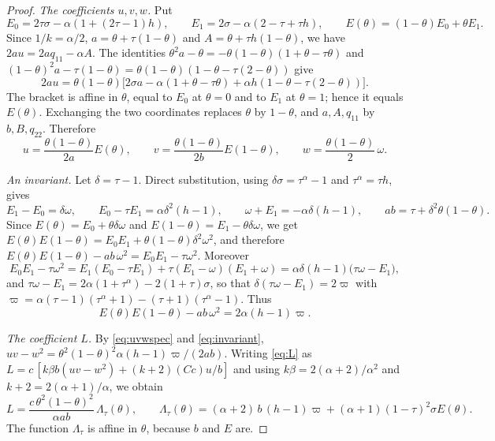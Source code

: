 \documentclass[11pt]{amsart}
\theoremstyle{definition}
\theoremstyle{remark}
\numberwithin{equation}{section}
\begin{document}
\begin{proof}
\emph{The coefficients $u,v,w$.} Put
\[
E_0=2\tau\sigma-\alpha(1+(2\tau-1)h),\qquad E_1=2\sigma-\alpha(2-\tau+\tau h),\qquad E(\theta)=(1-\theta)E_0+\theta E_1 .
\]
Since $1/k=\alpha/2$, $a=\theta+\tau(1-\theta)$ and $A=\theta+\tau h(1-\theta)$, we have $2au=2aq_{11}-\alpha A$. The identities $\theta^2a-\theta=-\theta(1-\theta)(1+\theta-\tau\theta)$ and $(1-\theta)^2a-\tau(1-\theta)=\theta(1-\theta)(1-\theta-\tau(2-\theta))$ give
\[
2au=\theta(1-\theta)\bigl[2\sigma a-\alpha(1+\theta-\tau\theta)+\alpha h(1-\theta-\tau(2-\theta))\bigr].
\]
The bracket is affine in $\theta$, equal to $E_0$ at $\theta=0$ and to $E_1$ at $\theta=1$; hence it equals $E(\theta)$. Exchanging the two coordinates replaces $\theta$ by $1-\theta$, and $a,A,q_{11}$ by $b,B,q_{22}$. Therefore
\begin{equation}\label{eq:uvwspec}
u=\frac{\theta(1-\theta)}{2a}E(\theta),\qquad v=\frac{\theta(1-\theta)}{2b}E(1-\theta),\qquad w=\frac{\theta(1-\theta)}2\,\omega .
\end{equation}

\emph{An invariant.} Let $\delta=\tau-1$. Direct substitution, using $\delta\sigma=\tau^\alpha-1$ and $\tau^\alpha=\tau h$, gives
\[
E_1-E_0=\delta\omega,\qquad E_0-\tau E_1=\alpha\delta^2(h-1),\qquad \omega+E_1=-\alpha\delta(h-1),\qquad ab=\tau+\delta^2\theta(1-\theta).
\]
Since $E(\theta)=E_0+\theta\delta\omega$ and $E(1-\theta)=E_1-\theta\delta\omega$, we get $E(\theta)E(1-\theta)=E_0E_1+\theta(1-\theta)\delta^2\omega^2$, and therefore $E(\theta)E(1-\theta)-ab\,\omega^2=E_0E_1-\tau\omega^2$. Moreover
\[
E_0E_1-\tau\omega^2=E_1(E_0-\tau E_1)+\tau(E_1-\omega)(E_1+\omega)=\alpha\delta(h-1)\bigl(\tau\omega-E_1\bigr),
\]
and $\tau\omega-E_1=2\alpha(1+\tau^\alpha)-2(1+\tau)\sigma$, so that $\delta(\tau\omega-E_1)=2\varpi$ with $\varpi=\alpha(\tau-1)(\tau^\alpha+1)-(\tau+1)(\tau^\alpha-1)$. Thus
\begin{equation}\label{eq:invariant}
E(\theta)E(1-\theta)-ab\,\omega^2=2\alpha(h-1)\varpi .
\end{equation}

\emph{The coefficient $L$.} By \eqref{eq:uvwspec} and \eqref{eq:invariant}, $uv-w^2=\theta^2(1-\theta)^2\alpha(h-1)\varpi/(2ab)$. Writing \eqref{eq:L} as $L=c\,[k\beta b(uv-w^2)+(k+2)(Cc)u/b]$ and using $k\beta=2(\alpha+2)/\alpha^2$ and $k+2=2(\alpha+1)/\alpha$, we obtain
\begin{equation}\label{eq:Lspec}
L=\frac{c\,\theta^2(1-\theta)^2}{\alpha ab}\,\Lambda_\tau(\theta),\qquad \Lambda_\tau(\theta)=(\alpha+2)\,b\,(h-1)\varpi+(\alpha+1)(1-\tau)^2\sigma E(\theta).
\end{equation}
The function $\Lambda_\tau$ is affine in $\theta$, because $b$ and $E$ are.


\end{proof}
\end{document}
